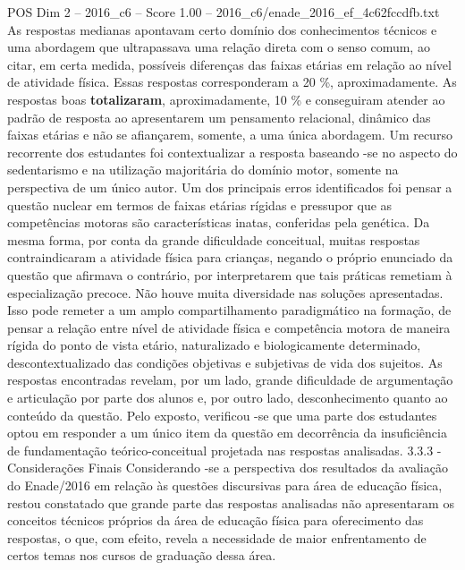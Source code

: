 \begin{textsample}{POS Dim 2 – 2016\_c6 – Score 1.00 – 2016\_c6/enade\_2016\_ef\_4c62fccdfb.txt}
As respostas medianas apontavam certo domínio dos conhecimentos técnicos e uma abordagem que ultrapassava uma relação direta com o senso comum, ao citar, em certa medida, possíveis diferenças das faixas etárias em relação ao nível de atividade física.
Essas respostas corresponderam a 20 \%, aproximadamente.
As respostas boas \textbf{totalizaram}, aproximadamente, 10 \% e conseguiram atender ao padrão de resposta ao apresentarem um pensamento relacional, dinâmico das faixas etárias e não se afiançarem, somente, a uma única abordagem.
Um recurso recorrente dos estudantes foi contextualizar a resposta baseando -se no aspecto do sedentarismo e na utilização majoritária do domínio motor, somente na perspectiva de um único autor.
Um dos principais erros identificados foi pensar a questão nuclear em termos de faixas etárias rígidas e pressupor que as competências motoras são características inatas, conferidas pela genética.
Da mesma forma, por conta da grande dificuldade conceitual, muitas respostas contraindicaram a atividade física para crianças, negando o próprio enunciado da questão que afirmava o contrário, por interpretarem que tais práticas remetiam à especialização precoce.
Não houve muita diversidade nas soluções apresentadas.
Isso pode remeter a um amplo compartilhamento paradigmático na formação, de pensar a relação entre nível de atividade física e competência motora de maneira rígida do ponto de vista etário, naturalizado e biologicamente determinado, descontextualizado das condições objetivas e subjetivas de vida dos sujeitos.
As respostas encontradas revelam, por um lado, grande dificuldade de argumentação e articulação por parte dos alunos e, por outro lado, desconhecimento quanto ao conteúdo da questão.
Pelo exposto, verificou -se que uma parte dos estudantes optou em responder a um único item da questão em decorrência da insuficiência de fundamentação teórico-conceitual projetada nas respostas analisadas. 3.3.3 - Considerações Finais Considerando -se a perspectiva dos resultados da avaliação do Enade/2016 em relação às questões discursivas para área de educação física, restou constatado que grande parte das respostas analisadas não apresentaram os conceitos técnicos próprios da área de educação física para oferecimento das respostas, o que, com efeito, revela a necessidade de maior enfrentamento de certos temas nos cursos de graduação dessa área.

\end{textsample}
